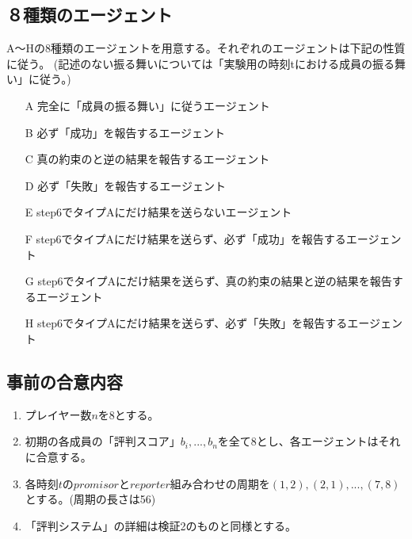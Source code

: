   \subsection{８種類のエージェント}
    A〜Hの8種類のエージェントを用意する。それぞれのエージェントは下記の性質に従う。
    (記述のない振る舞いについては「実験用の時刻tにおける成員の振る舞い」に従う。)
    \begin{itemize}
      \item[A] 完全に「成員の振る舞い」に従うエージェント
      \item[B] 必ず「成功」を報告するエージェント
      \item[C] 真の約束のと逆の結果を報告するエージェント
      \item[D] 必ず「失敗」を報告するエージェント
      \item[E] step6でタイプAにだけ結果を送らないエージェント
      \item[F] step6でタイプAにだけ結果を送らず、必ず「成功」を報告するエージェント
      \item[G] step6でタイプAにだけ結果を送らず、真の約束の結果と逆の結果を報告するエージェント
      \item[H] step6でタイプAにだけ結果を送らず、必ず「失敗」を報告するエージェント
    \end{itemize}

  \subsection{事前の合意内容}
    \begin{enumerate}
      \item プレイヤー数$n$を$8$とする。
      \item 初期の各成員の「評判スコア」${b_i, ..., b_n}$を全て$8$とし、各エージェントはそれに合意する。
      \item 各時刻$t$の$promisor$と$reporter$組み合わせの周期を$(1, 2), (2, 1), ..., (7, 8)$とする。(周期の長さは56)
      \item 「評判システム」の詳細は検証2のものと同様とする。
    \end{enumerate}

